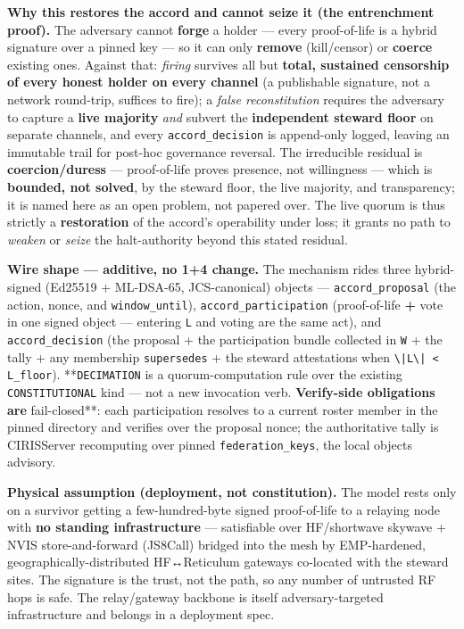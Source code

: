 \documentclass[11pt]{article}
\begin{document}
\textbf{Why this restores the accord and cannot seize it (the entrenchment proof).} The adversary cannot \textbf{forge} a holder — every proof-of-life is a hybrid signature over a pinned key — so it can only \textbf{remove} (kill/censor) or \textbf{coerce} existing ones. Against that: \textit{firing} survives all but \textbf{total, sustained censorship of every honest holder on every channel} (a publishable signature, not a network round-trip, suffices to fire); a \textit{false reconstitution} requires the adversary to capture a \textbf{live majority} \textit{and} subvert the \textbf{independent steward floor} on separate channels, and every \texttt{accord\_decision} is append-only logged, leaving an immutable trail for post-hoc governance reversal. The irreducible residual is \textbf{coercion/duress} — proof-of-life proves presence, not willingness — which is \textbf{bounded, not solved}, by the steward floor, the live majority, and transparency; it is named here as an open problem, not papered over. The live quorum is thus strictly a \textbf{restoration} of the accord's operability under loss; it grants no path to \textit{weaken} or \textit{seize} the halt-authority beyond this stated residual.


\textbf{Wire shape — additive, no 1+4 change.} The mechanism rides three hybrid-signed (Ed25519 + ML-DSA-65, JCS-canonical) objects — \texttt{accord\_proposal} (the action, nonce, and \texttt{window\_until}), \texttt{accord\_participation} (proof-of-life \textbf{+} vote in one signed object — entering \texttt{L} and voting are the same act), and \texttt{accord\_decision} (the proposal + the participation bundle collected in \texttt{W} + the tally + any membership \texttt{supersedes} + the steward attestations when \texttt{\textbackslash{}|L\textbackslash{}| < L\_floor}). **\texttt{DECIMATION} is a quorum-computation rule over the existing \texttt{CONSTITUTIONAL} kind — not a new invocation verb.\textbf{ Verify-side obligations are }fail-closed**: each participation resolves to a current roster member in the pinned directory and verifies over the proposal nonce; the authoritative tally is CIRISServer recomputing over pinned \texttt{federation\_keys}, the local objects advisory.


\textbf{Physical assumption (deployment, not constitution).} The model rests only on a survivor getting a few-hundred-byte signed proof-of-life to a relaying node with \textbf{no standing infrastructure} — satisfiable over HF/shortwave skywave + NVIS store-and-forward (JS8Call) bridged into the mesh by EMP-hardened, geographically-distributed HF↔Reticulum gateways co-located with the steward sites. The signature is the trust, not the path, so any number of untrusted RF hops is safe. The relay/gateway backbone is itself adversary-targeted infrastructure and belongs in a deployment spec.
\end{document}
